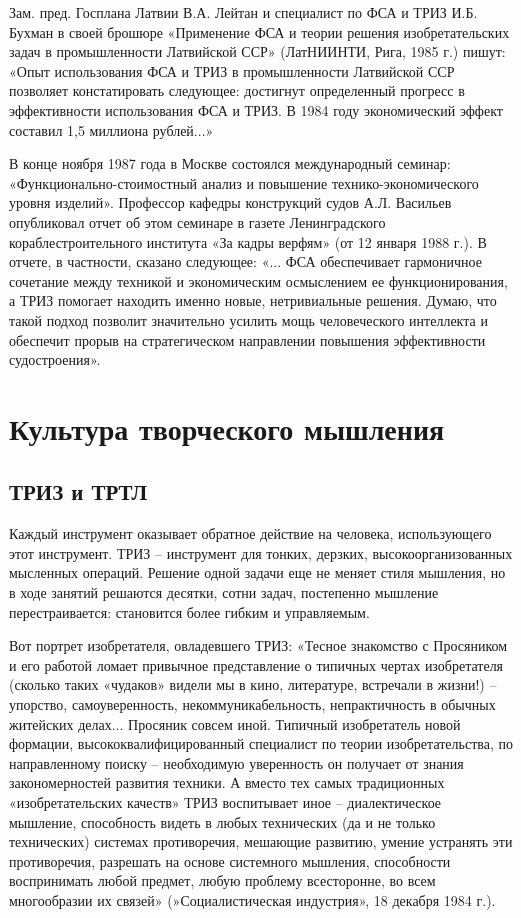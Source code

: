 \documentclass[11pt,a4paper]{article}
\begin{document}
Зам. пред. Госплана Латвии В.А. Лейтан и специалист по ФСА и ТРИЗ И.Б. Бухман
в своей брошюре «Применение ФСА и теории решения изобретательских задач в
промышленности Латвийской ССР» (ЛатНИИНТИ, Рига, 1985 г.) пишут: «Опыт
использования ФСА и ТРИЗ в промышленности Латвийской ССР позволяет
констатировать следующее: достигнут определенный прогресс в эффективности
использования ФСА и ТРИЗ. В 1984 году экономический эффект составил 1,5
миллиона рублей...»

В конце ноября 1987 года в Москве состоялся международный семинар:
«Функционально-стоимостный анализ и повышение технико-экономического уровня
изделий». Профессор кафедры конструкций судов А.Л. Васильев опубликовал отчет
об этом семинаре в газете Ленинградского кораблестроительного института «За
кадры верфям» (от 12 января 1988 г.). В отчете, в частности, сказано
следующее: «... ФСА обеспечивает гармоничное сочетание между техникой и
экономическим осмыслением ее функционирования, а ТРИЗ помогает находить именно
новые, нетривиальные решения. Думаю, что такой подход позволит значительно
усилить мощь человеческого интеллекта и обеспечит прорыв на стратегическом
направлении повышения эффективности судостроения».

\section{Культура творческого мышления}

\subsection{ТРИЗ и ТРТЛ}

Каждый инструмент оказывает обратное действие на человека, использующего этот
инструмент. ТРИЗ -- инструмент для тонких, дерзких, высокоорганизованных
мысленных операций. Решение одной задачи еще не меняет стиля мышления, но в
ходе занятий решаются десятки, сотни задач, постепенно мышление
перестраивается: становится более гибким и управляемым.

Вот портрет изобретателя, овладевшего ТРИЗ: «Тесное знакомство с Просяником и
его работой ломает привычное представление о типичных чертах изобретателя
(сколько таких «чудаков» видели мы в кино, литературе, встречали в жизни!) --
упорство, самоуверенность, некоммуникабельность, непрактичность в обычных
житейских делах... Просяник совсем иной. Типичный изобретатель новой формации,
высококвалифицированный специалист по теории изобретательства, по
направленному поиску -- необходимую уверенность он получает от знания
закономерностей развития техники. А вместо тех самых традиционных
«изобретательских качеств» ТРИЗ воспитывает иное -- диалектическое мышление,
способность видеть в любых технических (да и не только технических) системах
противоречия, мешающие развитию, умение устранять эти противоречия, разрешать
на основе системного мышления, способности воспринимать любой предмет, любую
проблему всесторонне, во всем многообразии их связей» (»Социалистическая
индустрия», 18 декабря 1984 г.).
\end{document}
